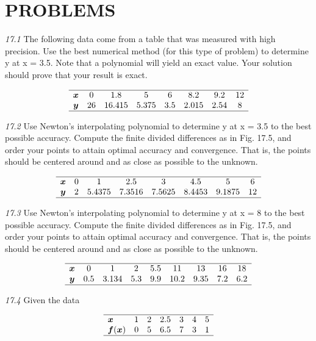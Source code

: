 \documentclass[../main.tex]{subfiles}
\begin{document}
\section*{PROBLEMS}
\begin{multicols}{2}

\noindent\textit{17.1} The following data come from a table that was measured with high precision. Use the best numerical method
(for this type of problem) to determine y at x = 3.5. Note
that a polynomial will yield an exact value. Your solution
should prove that your result is exact.

$$
\begin{array}{cccccccc}
\hline \boldsymbol{x} & 0 & 1.8 & 5 & 6 & 8.2 & 9.2 & 12 \\
\boldsymbol{y} & 26 & 16.415 & 5.375 & 3.5 & 2.015 & 2.54 & 8 \\
\hline
\end{array}
$$

\noindent\textit{17.2} Use Newton's interpolating polynomial to determine y at
x = 3.5 to the best possible accuracy. Compute the finite divided differences as in Fig. 17.5, and order your points to attain
optimal accuracy and convergence. That is, the points should
be centered around and as close as possible to the unknown.

$$
\begin{array}{cccccccc}
\hline \boldsymbol{x} & 0 & 1 & 2.5 & 3 & 4.5 & 5 & 6 \\
\boldsymbol{y} & 2 & 5.4375 & 7.3516 & 7.5625 & 8.4453 & 9.1875 & 12 \\
\hline
\end{array}
$$

\noindent\textit{17.3} Use Newton's interpolating polynomial to determine y at
x = 8 to the best possible accuracy. Compute the finite divided
differences as in Fig. 17.5, and order your points to attain optimal accuracy and convergence. That is, the points should be
centered around and as close as possible to the unknown.

$$
\begin{array}{ccccccccc}
\hline \boldsymbol{x} & 0 & 1 & 2 & 5.5 & 11 & 13 & 16 & 18 \\
\boldsymbol{y} & 0.5 & 3.134 & 5.3 & 9.9 & 10.2 & 9.35 & 7.2 & 6.2 \\
\hline
\end{array}
$$

\noindent\textit{17.4} Given the data

$$
\begin{array}{lllllll}
\hline \boldsymbol{x} & 1 & 2 & 2.5 & 3 & 4 & 5 \\
\boldsymbol{f}(\boldsymbol{x}) & 0 & 5 & 6.5 & 7 & 3 & 1 \\
\hline
\end{array}
$$


\end{multicols}
\end{document}
